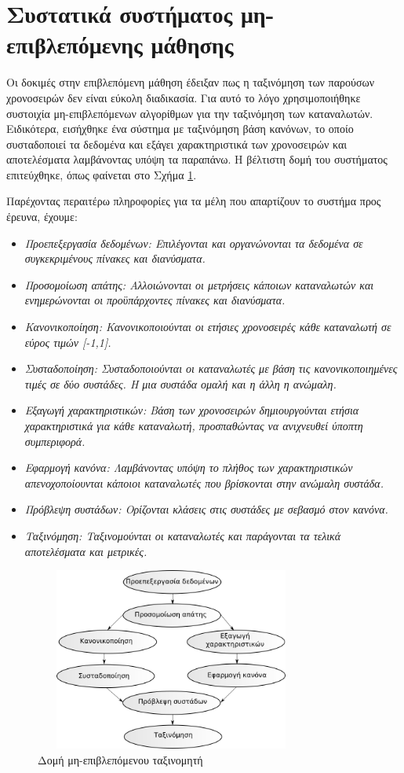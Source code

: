 \section{Συστατικά συστήματος μη-επιβλεπόμενης μάθησης}
Οι δοκιμές στην επιβλεπόμενη μάθηση έδειξαν πως η ταξινόμηση των παρούσων χρονοσειρών δεν είναι εύκολη διαδικασία. Για αυτό το λόγο χρησιμοποιήθηκε συστοιχία μη-επιβλεπόμενων αλγορίθμων για την ταξινόμηση των καταναλωτών. Ειδικότερα, εισήχθηκε ένα σύστημα με ταξινόμηση βάση κανόνων, το οποίο συσταδοποιεί τα δεδομένα και εξάγει χαρακτηριστικά των χρονοσειρών και αποτελέσματα λαμβάνοντας υπόψη τα παραπάνω. Η βέλτιστη δομή του συστήματος επιτεύχθηκε, όπως φαίνεται στο Σχήμα \ref{fig:unsupervisedsystem}.\par
Παρέχοντας περαιτέρω πληροφορίες για τα μέλη που απαρτίζουν το συστήμα προς έρευνα, έχουμε:
\begin{itemize}
\item \em{Προεπεξεργασία δεδομένων}: Επιλέγονται και οργανώνονται τα δεδομένα σε συγκεκριμένους πίνακες και διανύσματα.
\item \em{Προσομοίωση απάτης}: Αλλοιώνονται οι μετρήσεις κάποιων καταναλωτών και ενημερώνονται οι προϋπάρχοντες πίνακες και διανύσματα.
\item \em{Κανονικοποίηση}: Κανονικοποιούνται οι ετήσιες χρονοσειρές κάθε καταναλωτή σε εύρος τιμών [-1,1].
\item \em{Συσταδοποίηση}: Συσταδοποιούνται οι καταναλωτές με βάση τις κανονικοποιημένες τιμές σε δύο συστάδες. Η μια συστάδα ομαλή και η άλλη η ανώμαλη. 
\item \em{Εξαγωγή χαρακτηριστικών}: Βάση των χρονοσειρών δημιουργούνται ετήσια χαρακτηριστικά για κάθε καταναλωτή, προσπαθώντας να ανιχνευθεί ύποπτη συμπεριφορά.
\item \em{Εφαρμογή κανόνα}: Λαμβάνοντας υπόψη το πλήθος των χαρακτηριστικών απενοχοποίουνται κάποιοι καταναλωτές που βρίσκονται στην ανώμαλη συστάδα.
\item \em{Πρόβλεψη συστάδων}: Ορίζονται κλάσεις στις συστάδες με σεβασμό στον κανόνα.
\item \em{Ταξινόμηση}: Ταξινομούνται οι καταναλωτές και παράγονται τα τελικά αποτελέσματα και μετρικές.
\end{itemize}
\begin{figure}
\centering
 \includegraphics[width=90mm, height=60mm]{../../plots/systems/un_supervised.png}
 \caption{Δομή μη-επιβλεπόμενου ταξινομητή}
\label{fig:unsupervisedsystem}
 \end{figure}
 
